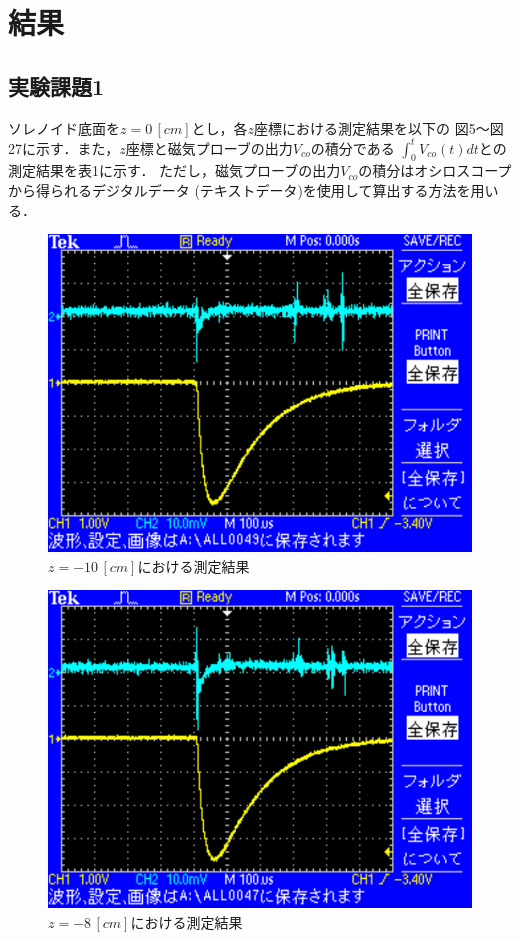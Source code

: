 
\section{結果}

\subsection{実験課題1}
ソレノイド底面を$z=0\,[\si{cm}]$とし，各$z$座標における測定結果を以下の
図5～図27に示す．また，$z$座標と磁気プローブの出力$V_{co}$の積分である
$\int_{0}^{t}V_{co}(t)dt$との測定結果を表1に示す．
ただし，磁気プローブの出力$V_{co}$の積分はオシロスコープから得られるデジタルデータ
(テキストデータ)を使用して算出する方法を用いる．

\begin{figure}[H]
    \centering
    \includegraphics[scale=0.5]{images-23.pdf}
    \caption{$z=-10\,[cm]$における測定結果}
\end{figure}

\begin{figure}[H]
    \centering
    \includegraphics[scale=0.5]{images-22.pdf}
    \caption{$z=-8\,[cm]$における測定結果}
\end{figure}

